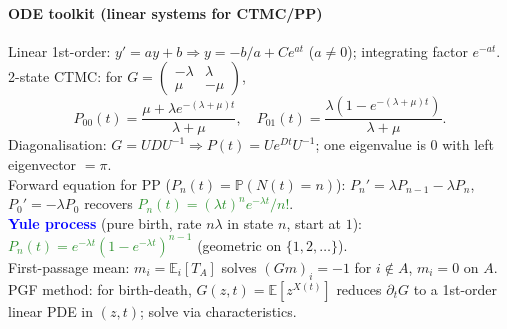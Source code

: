 \paragraph{ODE toolkit (linear systems for CTMC/PP)}
\textcolor{Bittersweet}{Linear 1st-order}: $y'=ay+b\Rightarrow y=-b/a+Ce^{at}$
($a\ne 0$); integrating factor $e^{-at}$.\\
\textcolor{Bittersweet}{2-state CTMC}: for
$G=\begin{pmatrix}-\lambda & \lambda\\ \mu & -\mu\end{pmatrix}$,
\[P_{00}(t)=\frac{\mu+\lambda e^{-(\lambda+\mu)t}}{\lambda+\mu},\quad
P_{01}(t)=\frac{\lambda(1-e^{-(\lambda+\mu)t})}{\lambda+\mu}.\]
\textcolor{Bittersweet}{Diagonalisation}: $G=UDU^{-1}\Rightarrow
P(t)=Ue^{Dt}U^{-1}$; one eigenvalue is $0$ with left
eigenvector $=\pi$.\\
\textcolor{Bittersweet}{Forward equation for PP} ($P_n(t)=\mathbb{P}(N(t)=n)$):
$P_n'=\lambda P_{n-1}-\lambda P_n$, $P_0'=-\lambda P_0$ recovers
\textcolor{ForestGreen}{$P_n(t)=(\lambda t)^n e^{-\lambda t}/n!$}.\\
\textcolor{Blue}{\textbf{Yule process}} (pure birth, rate $n\lambda$ in state $n$,
start at $1$):
\textcolor{ForestGreen}{$P_n(t)=e^{-\lambda t}(1-e^{-\lambda t})^{n-1}$}
(geometric on $\{1,2,\ldots\}$).\\
\textcolor{Bittersweet}{First-passage mean}: $m_i=\mathbb{E}_i[T_A]$ solves
$(Gm)_i=-1$ for $i\notin A$, $m_i=0$ on $A$.\\
\textcolor{Bittersweet}{PGF method}: for birth-death,
$G(z,t)=\mathbb{E}[z^{X(t)}]$ reduces $\partial_t G$ to a 1st-order linear PDE in
$(z,t)$; solve via characteristics.
